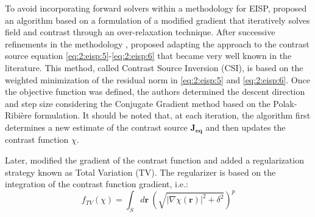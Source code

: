 			To avoid incorporating forward solvers within a methodology for EISP, \cite{kleinman1992modified} proposed an algorithm based on a formulation of a modified gradient that iteratively solves field and contrast through an over-relaxation technique. After successive refinements in the methodology \citep{kleinman1993extended,kleinman1994two,berg1995total}, \cite{berg1997constrast} proposed adapting the approach to the contrast source equation \eqref{eq:2:eisp:5}-\eqref{eq:2:eisp:6} that became very well known in the literature. This method, called Contrast Source Inversion (CSI), is based on the weighted minimization of the residual norm in \eqref{eq:2:eisp:5} and \eqref{eq:2:eisp:6}. Once the objective function was defined, the authors determined the descent direction and step size considering the Conjugate Gradient method based on the Polak-Ribière formulation. It should be noted that, at each iteration, the algorithm first determines a new estimate of the contrast source $\mathbf{J_{eq}}$ and then updates the contrast function $\chi$.
			
			Later, \cite{berg1999extended} modified the gradient of the contrast function and added a regularization strategy known as Total Variation (TV). The regularizer is based on the integration of the contrast function gradient, i.e.:
			\begin{equation}
				f_{TV}(\chi) = \int_S d\mathbf{r}~ \left(\sqrt{|\nabla\chi(\mathbf{r})|^2+\delta^2}\right)^p \label{eq:3:deterministic:csi:totalvariation}
			\end{equation}
		
